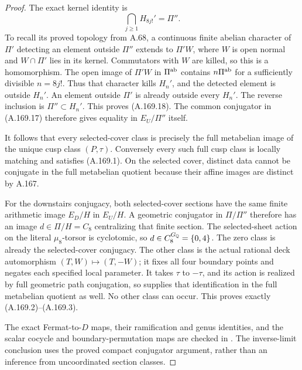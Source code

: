 \begin{proof}
The exact kernel identity is
\[
                         \bigcap_{j\ge1}H_{8j!}'=\Pi''.
\tag{A.169.18}
\]
To recall its proved topology from A.68, a continuous finite abelian
character of \(\Pi'\) detecting an element outside \(\Pi''\)
extends to \(\Pi'W\), where \(W\) is open normal and
\(W\cap\Pi'\) lies in its kernel.  Commutators with \(W\)
are killed, so this is a homomorphism.  The open image of
\(\Pi'W\) in \(\Pi^{\rm ab}\) contains \(n\Pi^{\rm ab}\)
for a sufficiently divisible \(n=8j!\).  Thus that character
kills \(H_n'\), and the detected element is outside \(H_n'\).
An element outside \(\Pi'\) is already outside every \(H_n'\).
The reverse inclusion is \(\Pi''\subset H_n'\).
This proves (A.169.18).  The common conjugator in (A.169.17)
therefore gives equality in \(E_U/\Pi''\) itself.

It follows that every selected-cover class is precisely the full
metabelian image of the unique cusp class \((P,\tau)\).
Conversely every such full cusp class is locally matching and
satisfies (A.169.1).  On the selected cover, distinct data cannot
be conjugate in the full metabelian quotient because their affine
images are distinct by A.167.

For the downstairs conjugacy, both selected-cover sections have the
same finite arithmetic image \(E_D/H\) in \(E_U/H\).
A geometric conjugator in \(\Pi/\Pi''\) therefore has an image
\(d\in\Pi/H=C_8\) centralizing that finite section.
The selected-sheet action on the literal \(\mu_8\)-torsor is
cyclotomic, so \(d\in C_8^{G_\mathbb Q}=\{0,4\}\).
The zero class is already the selected-cover conjugacy.  The other
class is the actual rational deck automorphism
\((T,W)\mapsto(T,-W)\); it fixes all four boundary points and
negates each specified local parameter.  It takes \(\tau\) to
\(-\tau\), and its action is realized by full geometric path
conjugation, so supplies that identification in the full metabelian
quotient as well.  No other class can occur.  This proves exactly
(A.169.2)--(A.169.3).

The exact Fermat-to-\(D\) maps, their ramification and genus
identities, and the scalar cocycle and boundary-permutation maps are
checked in .
The inverse-limit conclusion uses the proved compact conjugator
argument, rather than an inference from uncoordinated section classes.
\end{proof}
